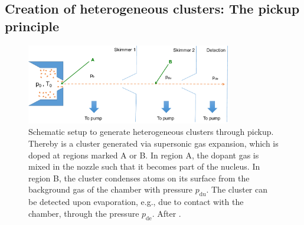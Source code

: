 \subsection{Creation of heterogeneous clusters: The pickup principle}\label{sec:heterogeneous-cluster}
\begin{figure}
	\centering
		\includegraphics[width=0.80\textwidth]{images/pick-up.pdf}
	\caption[Schematic of a pickup (gas-)source.]{Schematic setup to generate heterogeneous clusters through pickup. Thereby is a cluster generated via supersonic gas expansion, which is doped at regions marked A or B. In region A, the dopant gas is mixed in the nozzle such that it becomes part of the nucleus. In region B, the cluster condenses atoms on its surface from the background gas of the chamber with pressure $p_{\text{du}}$. The cluster can be detected upon evaporation, e.g., due to contact with the chamber, through the pressure $p_{\text{de}}$. After \citep{Gough-1985-JChemPhys,Haberland-1994-Springer}.}
	\label{fig:pickupPrinciple}
\end{figure}
